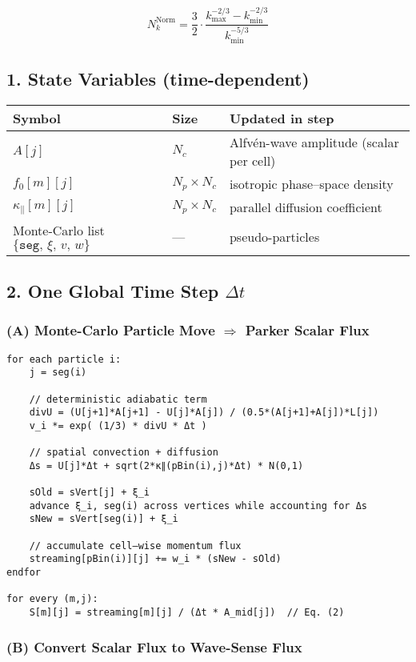 \[
N_k^{\text{Norm}} = \frac{3}{2} \cdot \frac{k_{\max}^{-2/3} - k_{\min}^{-2/3}}{k_{\min}^{-5/3}} \tag{Eq. 2}
\]

\subsection*{1. State Variables (time-dependent)}

\begin{tabular}{|l|l|l|}
\hline
\textbf{Symbol} & \textbf{Size} & \textbf{Updated in step} \\
\hline
$A[j]$ & $N_c$ & Alfvén-wave amplitude (scalar per cell) \\
$f_0[m][j]$ & $N_p \times N_c$ & isotropic phase–space density \\
$\kappa_\parallel[m][j]$ & $N_p \times N_c$ & parallel diffusion coefficient \\
Monte-Carlo list $\{ \texttt{seg},\, \xi,\, v,\, w \}$ & — & pseudo-particles \\
\hline
\end{tabular}

\subsection*{2. One Global Time Step $\Delta t$}

\subsubsection*{(A) Monte-Carlo Particle Move $\Rightarrow$ Parker Scalar Flux}

\begin{verbatim}
for each particle i:
    j = seg(i)

    // deterministic adiabatic term
    divU = (U[j+1]*A[j+1] - U[j]*A[j]) / (0.5*(A[j+1]+A[j])*L[j])
    v_i *= exp( (1/3) * divU * Δt )

    // spatial convection + diffusion
    Δs = U[j]*Δt + sqrt(2*κ∥(pBin(i),j)*Δt) * N(0,1)

    sOld = sVert[j] + ξ_i
    advance ξ_i, seg(i) across vertices while accounting for Δs
    sNew = sVert[seg(i)] + ξ_i

    // accumulate cell–wise momentum flux
    streaming[pBin(i)][j] += w_i * (sNew - sOld)
endfor

for every (m,j):
    S[m][j] = streaming[m][j] / (Δt * A_mid[j])  // Eq. (2)
\end{verbatim}

\subsubsection*{(B) Convert Scalar Flux to Wave-Sense Flux}

